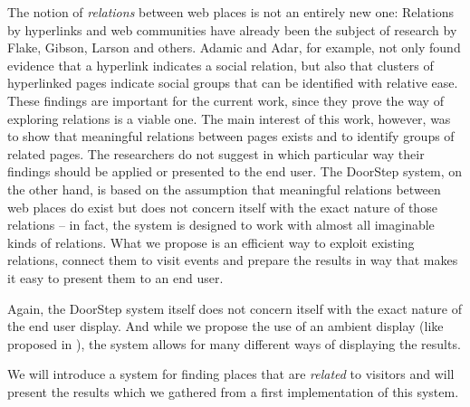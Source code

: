 \documentclass[a4paper]{danarticle}
\theoremstyle{remark}
\begin{document}
    The notion of \emph{relations} between web places is not an entirely new 
    one: Relations by hyperlinks and web communities have already 
    been the subject of research by Flake\cite{flake}, Gibson\cite{gibson}, 
    Larson\cite{larson} and others. 
    Adamic and Adar\cite{links}, for example, not only found 
    evidence that a hyperlink indicates a social relation, but also that 
    clusters of hyperlinked pages indicate social groups that can be identified 
    with relative ease. These findings are important for the current work, 
    since they prove the way of exploring relations is a viable one. The main
    interest of this work, however, was to show that meaningful relations 
    between pages exists and to identify groups of related pages. The
    researchers do not suggest in which particular way their findings should be 
    applied or presented to the end user. 
    The DoorStep system, on the other hand, is based on the assumption that 
    meaningful relations between web places do exist but does not concern itself 
    with the exact nature of those relations -- in fact, the system is designed 
    to work with almost all imaginable kinds of relations. What we propose is an 
    efficient way to exploit existing relations, connect them to visit events 
    and prepare the results in way that makes it easy to present them to an end 
    user.
    
    Again, the DoorStep system itself does not concern itself with the exact 
    nature of the end user display. And while we propose the use of an ambient 
    display (like proposed in \cite{ambient}), the system allows for many 
    different ways of displaying the results.
    
    We will introduce a system for finding places that are \textit{related} to
    visitors and will present the results which we gathered from a first
    implementation of this system.
\end{document}
